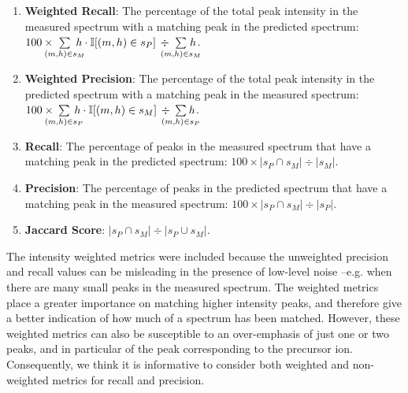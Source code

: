 \begin{enumerate}
\item \textbf{Weighted Recall}: The percentage of the total peak intensity in the measured spectrum with a matching peak in the predicted spectrum:
	$ 100 \times \hspace{-10pt}\sum\limits_{(m,h)\in s_{M}} \hspace{-10pt}h \cdot \mathbb{I}[(m,h) \in s_{P}] \hspace{2pt}\div \hspace{-10pt}\sum\limits_{(m,h)\in s_{M}}\hspace{-12pt}h$.
\item \textbf{Weighted Precision}: The percentage of the total peak intensity in the predicted spectrum with a matching peak in the measured spectrum:
	$ 100 \times \hspace{-10pt}\sum\limits_{(m,h)\in s_{P}} \hspace{-10pt}h \cdot \mathbb{I}[(m,h) \in s_{M}] \hspace{2pt}\div \hspace{-10pt}\sum\limits_{(m,h)\in s_{P}}\hspace{-12pt}h$.
	\item \textbf{Recall}: The percentage of peaks in the measured spectrum that have a matching peak in the predicted spectrum: 
	$ 100 \times | s_{P} \cap s_{M} | \div |s_{M}| $.
\item \textbf{Precision}: The percentage of peaks in the predicted spectrum that have a matching peak in the measured spectrum: 
	$ 100 \times | s_{P} \cap s_{M} | \div |s_{P}| $.	
\item \textbf{Jaccard Score}:	
	$ | s_{P} \cap s_{M} | \div |s_{P} \cup s_{M}| $.
\end{enumerate} 

The intensity weighted metrics were included because the unweighted precision and recall values can be misleading in the presence of low-level noise --e.g. when there are many small peaks in the measured spectrum. The weighted metrics place a greater importance on matching higher intensity peaks, and therefore give a better indication of how much of a spectrum has been matched. However, these weighted metrics can also be susceptible to an over-emphasis of just one or two peaks, and in particular of the peak corresponding to the precursor ion. Consequently, we think it is informative to consider both weighted and non-weighted metrics for recall and precision.

